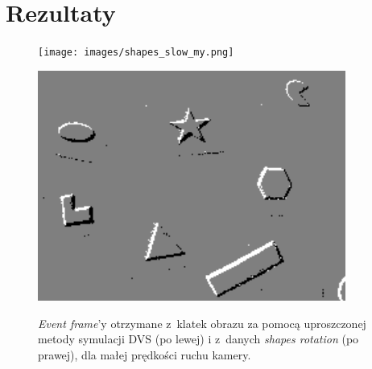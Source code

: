 \section{Rezultaty}  %






\begin{figure}
    \centering
    \begin{minipage}{0.5\textwidth}
        \centering
        \texttt{[image: images/shapes\_slow\_my.png]}
        \label{gra:my_dvs_shapes}
    \end{minipage}\hfill
    \begin{minipage}{0.5\textwidth}
        \centering
        \includegraphics[width = 0.9\textwidth]{images/shapes_slow_org.png}
        \label{gra:real_shapes}
    \end{minipage}
    \caption{\textit{Event frame}'y otrzymane z~klatek obrazu za pomocą uproszczonej metody symulacji DVS (po lewej) i z~danych \textit{shapes rotation} \cite{dvs_dataset} (po prawej), dla małej prędkości ruchu kamery.}
    \label{fig:shapes_slow}
\end{figure}

